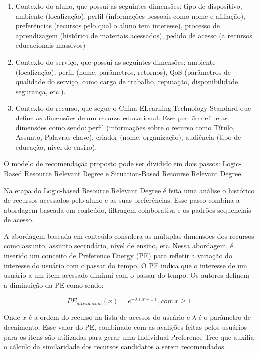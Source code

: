 \begin{enumerate}
\item Contexto do aluno, que possui as seguintes dimensões: tipo de dispositivo, ambiente (localização), perfil
(informações pessoais como nome e afiliação), preferências (recursos pelo qual o aluno tem interesse), processo de
aprendizagem (histórico de materiais acessados), pedido de acesso (a recursos educacionais massivos).
\item Contexto do serviço, que possui as seguintes dimensões: ambiente (localização), perfil (nome, parâmetros,
retornos), QoS (parâmetros de qualidade do serviço, como carga de trabalho, reputação, disponibilidade, segurança, etc.).
\item Contexto do recurso, que segue o China ELearning Technology Standard que define as dimensões de um recurso
educacional. Esse padrão define as dimensões como sendo: perfil (informações sobre o recurso como Título, Assunto,
Palavras-chave), criador (nome, organização), audiência (tipo de educação, nível de ensino).
\end{enumerate}

O modelo de recomendação proposto pode ser dividido em dois passos: Logic-Based Resource Relevant Degree e
Situation-Based Recourse Relevant Degree.

Na etapa do Logic-based Resource Relevant Degree é feita uma análise o histórico de recursos acessados pelo aluno e as
suas preferências. Esse passo combina a abordagem baseada em conteúdo, filtragem colaborativa e os padrões sequenciais
de acesso.

A abordagem baseada em conteúdo considera as múltiplas dimensões dos recursos como assunto, assunto secundário, nível
de ensino, etc. Nessa abordagem, é inserido um conceito de Preference Energy (PE) para refletir a variação do interesse
do usuário com o passar do tempo. O PE indica que o interesse de um usuário a um item acessado diminui com o passar do
tempo. Os autores definem a diminuição da PE como sendo:

\begin{equation}
  PE_{attenuation}(x) = e^{- \lambda (x-1)}, com \ x \geqslant 1
  \label{eq:luo-preference-energy}
\end{equation}

Onde $x$ é a ordem do recurso na lista de acessos do usuário e $\lambda$ é o parâmetro de decaimento. Esse valor do PE,
combinado com as avalições feitas pelos usuários para os itens são utilizadas para gerar uma Individual Preference Tree
que auxilia o cálculo da similaridade dos recursos candidatos a serem recomendados.

